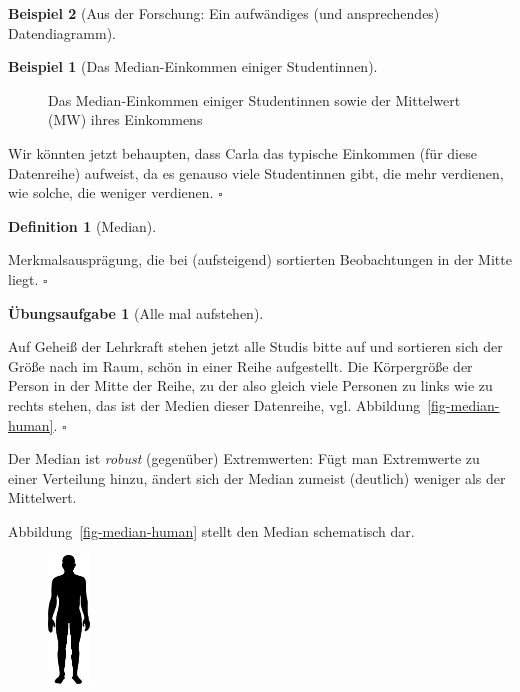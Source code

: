 \documentclass[
  a4paper,
]{scrbook}
\theoremstyle{definition}
\newtheorem{example}{Beispiel}[chapter]
\theoremstyle{definition}
\newtheorem{definition}{Definition}[chapter]
\theoremstyle{definition}
\newtheorem{exercise}{Übungsaufgabe}[chapter]
\theoremstyle{remark}
\begin{document}
\begin{example}[Aus der Forschung: Ein aufwändiges (und ansprechendes)
Datendiagramm]
\begin{example}[Das Median-Einkommen einiger
Studentinnen]
\begin{figure}
\begin{minipage}{\linewidth}
{}


\end{minipage}%

\caption{\label{fig-md1}Das Median-Einkommen einiger Studentinnen sowie
der Mittelwert (MW) ihres Einkommens}

\end{figure}%

Wir könnten jetzt behaupten, dass Carla das typische Einkommen (für
diese Datenreihe) aufweist, da es genauso viele Studentinnen gibt, die
mehr verdienen, wie solche, die weniger verdienen. \(\square\)

\end{example}

\begin{definition}[Median]\protect\hypertarget{def-median}{}\label{def-median}

Merkmalsausprägung, die bei (aufsteigend) sortierten Beobachtungen in
der Mitte liegt. \(\square\)

\end{definition}

\begin{exercise}[Alle mal
aufstehen]\protect\hypertarget{exr-aufstellen}{}\label{exr-aufstellen}

Auf Geheiß der Lehrkraft stehen jetzt alle Studis bitte auf und
sortieren sich der Größe nach im Raum, schön in einer Reihe aufgestellt.
Die Körpergröße der Person in der Mitte der Reihe, zu der also gleich
viele Personen zu links wie zu rechts stehen, das ist der Medien dieser
Datenreihe, vgl. Abbildung~\ref{fig-median-human}. \(\square\)

\end{exercise}

Der Median ist \emph{robust} (gegenüber) Extremwerten: Fügt man
Extremwerte zu einer Verteilung hinzu, ändert sich der Median zumeist
(deutlich) weniger als der Mittelwert.

Abbildung~\ref{fig-median-human} stellt den Median schematisch dar.

\begin{figure}

\begin{minipage}{0.20\linewidth}

\includegraphics[width=0.1\textwidth,height=\textheight]{img/Human_Silhouette.svg.png}


\end{minipage}
\end{figure}
\end{example}
\end{document}
